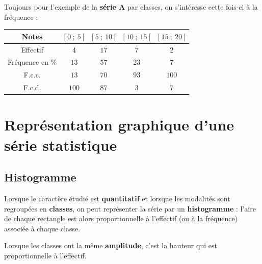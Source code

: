 \begin{ex}{}{}
Toujours pour l'exemple de la \textbf{série A} par classes, on s'intéresse cette fois-ci à la fréquence :

\begin{center}
\renewcommand{\arraystretch}{1.6}
\begin{tabular}{|c|*{4}{C{2}|}}\hline       
Notes & $[~0~;~5~[$ & $[~5~;~10~[$ & $[~10~;~15~[$ & $[~15~;~20~[$ \\\hline
Effectif & $4$ & $17$ & $7$ & $2$ \\\hline
Fréquence en \% & $13$ & $57$ & $23$ & $7$ \\\hline
F.c.c. & $13$ & $70$ & $93$ & $100$ \\\hline
F.c.d. & $100$ & $87$ & $3$ & $7$ \\\hline
\end{tabular}
\end{center}
\end{ex}

\pagebreak

\section{Représentation graphique d'une série statistique}

\subsection{Histogramme}

Lorsque le caractère étudié est \textbf{quantitatif} et lorsque les modalités sont regroupées en \textbf{classes}, on peut représenter la série par un \textbf{histogramme} : l'aire de chaque rectangle est alors proportionnelle à l'effectif (ou à la fréquence) associée à chaque classe.

Lorsque les classes ont la même \textbf{amplitude}, c'est la hauteur qui est proportionnelle à l'effectif.

